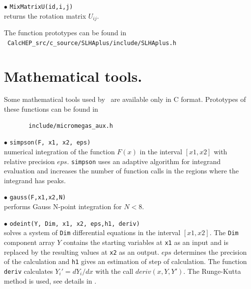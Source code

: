 \documentclass[12pt,a4paper]{article}
\begin{document}
\noindent
$\bullet$ \verb|MixMatrixU(id,i,j)|\\
returns the rotation matrix $U_{ij}$.

The function prototypes can be found in \\
\noindent
\verb| CalcHEP_src/c_source/SLHAplus/include/SLHAplus.h|

\section{Mathematical tools.}

Some mathematical tools used by \micro\ are available only 
in C format. Prototypes of these functions can be found in
\begin{verbatim}
       include/micromegas_aux.h 
\end{verbatim}

\noindent$\bullet$ \verb|simpson(F, x1, x2, eps)|\\
numerical integration of the function $F(x)$ in the interval $[x1,x2]$  
with relative precision $eps$. \verb|simpson| uses an adaptive algorithm 
for integrand evaluation and increases the number of function calls in 
the regions where the  integrand has peaks. 

\noindent$\bullet$ \verb|gauss(F,x1,x2,N)|\\
performs Gauss N-point integration for $N<8$.  

\noindent$\bullet$ \verb|odeint(Y, Dim, x1, x2, eps,h1, deriv)|\\
solves a  system of \verb|Dim| differential  equations in the interval 
$[x1,x2]$. The  \verb|Dim| component array $Y$ contains the starting variables at \verb|x1| as an input and is replaced by the
resulting values at \verb|x2| as an output. $eps$ determines the precision of the 
calculation and  \verb|h1| gives an estimation of step of calculation.  
The function \verb|deriv| calculates 
$Y_i' = dY_i/dx$ with the call $deriv(x,Y,Y')$. The Runge-Kutta method is
used, see details in \cite{Numerical}. 
\end{document}
